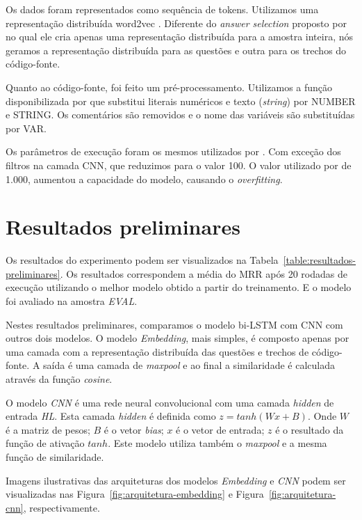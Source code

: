 \documentclass[12pt]{article}
\begin{document}
Os dados foram representados como sequência de tokens. Utilizamos uma representação distribuída word2vec \cite{mikolov-word2vec-2013}. Diferente do \textit{answer selection} proposto por \cite{tan-lstm-qa} no qual ele cria apenas uma representação distribuída para a amostra inteira, nós geramos a representação distribuída para as questões e outra para os trechos do código-fonte.

Quanto ao código-fonte, foi feito um pré-processamento. Utilizamos a função disponibilizada por \cite{Yao-staqc:2018} que substitui literais numéricos e texto (\textit{string}) por NUMBER e STRING. Os comentários são removidos e o nome das variáveis são substituídas por VAR.

Os parâmetros de execução foram os mesmos utilizados por \cite{tan-lstm-qa}. Com exceção dos filtros na camada CNN, que reduzimos para o valor 100. O valor utilizado por \cite{tan-lstm-qa} de 1.000, aumentou a capacidade do modelo, causando o \textit{overfitting}.




\section{Resultados preliminares}\label{sec:resultados-preliminares}

Os resultados do experimento podem ser visualizados na Tabela~\ref{table:resultados-preliminares}. Os resultados correspondem a média do MRR após 20 rodadas de execução utilizando o melhor modelo obtido a partir do treinamento. E o modelo foi avaliado na amostra \emph{EVAL}. 

Nestes resultados preliminares, comparamos o modelo bi-LSTM com CNN com outros dois modelos. O modelo \emph{Embedding}, mais simples, é composto apenas por uma camada com a representação distribuída das questões e trechos de código-fonte. A saída é uma camada de \textit{maxpool} e ao final a similaridade é calculada através da função \textit{cosine}. 

O modelo \emph{CNN} é uma rede neural convolucional com uma camada \textit{hidden} de entrada \emph{HL}. Esta camada \textit{hidden}  é definida como $z = tanh(Wx +B)$. Onde $W$ é a matriz de pesos; $B$ é o vetor \textit{bias}; $x$ é o vetor de entrada; $z$ é o resultado da função de ativação $tanh$.  Este modelo utiliza também o \textit{maxpool} e a mesma função de similaridade.

Imagens ilustrativas das arquiteturas dos modelos \emph{Embedding} e \emph{CNN} podem ser visualizadas nas Figura~\ref{fig:arquitetura-embedding} e Figura~\ref{fig:arquitetura-cnn}, respectivamente.
\end{document}
